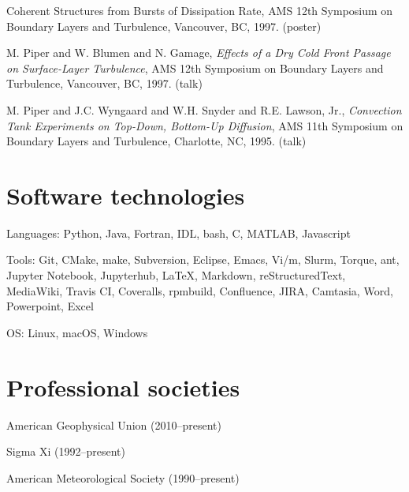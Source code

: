 \documentclass[letterpaper]{resume}
\begin{document}
\begin{enumerate}[{[}1{]}]
{    Coherent Structures from Bursts of Dissipation Rate}, {AMS 12th
    Symposium on Boundary Layers and Turbulence}, {Vancouver, BC},
    1997. (poster)
  \item {M. Piper and W. Blumen and N. Gamage}, \textit{Effects of a
    Dry Cold Front Passage on Surface-Layer Turbulence}, {AMS 12th
    Symposium on Boundary Layers and Turbulence}, {Vancouver, BC},
    1997. (talk)
  \item {M. Piper and J.C. Wyngaard and W.H. Snyder and R.E. Lawson,
    Jr.}, \textit{Convection Tank Experiments on Top-Down, Bottom-Up
    Diffusion}, {AMS 11th Symposium on Boundary Layers and
    Turbulence}, {Charlotte, NC}, 1995. (talk)
\end{enumerate}


\section{Software technologies}

\vspace{1.0em}
\begin{compactitem}[\itembullet]
  \item Languages: Python, Java, Fortran, IDL, bash, C, MATLAB, Javascript
  \item Tools: Git, CMake, make, Subversion, Eclipse, Emacs,
    Vi/m, Slurm, Torque, ant, Jupyter Notebook,
    Jupyterhub, \LaTeX, Markdown, reStructuredText, MediaWiki,
    Travis CI, Coveralls, rpmbuild, Confluence, JIRA, Camtasia,
    Word, Powerpoint, Excel
  \item OS: Linux, macOS, Windows
\end{compactitem}


\section{Professional societies}

\vspace{1.0em}
\begin{compactitem}[\itembullet]
  \item American Geophysical Union (2010--present) 
  \item Sigma Xi (1992--present)
  \item American Meteorological Society (1990--present)
\end{compactitem}
\end{document}
